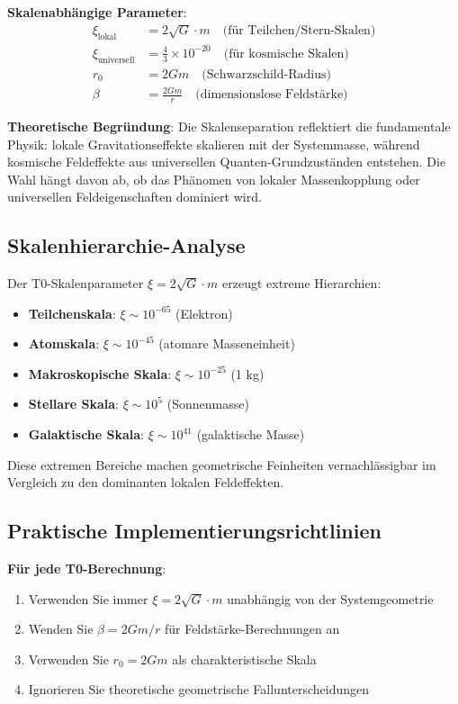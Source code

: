 \documentclass[12pt,a4paper]{article}
\begin{document}
	\textbf{Skalenabhängige Parameter}:
	\begin{align}
		\xi_{\text{lokal}} &= 2\sqrt{G} \cdot m \quad \text{(für Teilchen/Stern-Skalen)} \\
		\xi_{\text{universell}} &= \frac{4}{3} \times 10^{-20} \quad \text{(für kosmische Skalen)} \\
		r_0 &= 2Gm \quad \text{(Schwarzschild-Radius)} \\
		\beta &= \frac{2Gm}{r} \quad \text{(dimensionslose Feldstärke)}
	\end{align}
	
	\textbf{Theoretische Begründung}: Die Skalenseparation reflektiert die fundamentale Physik: lokale Gravitationseffekte skalieren mit der Systemmasse, während kosmische Feldeffekte aus universellen Quanten-Grundzuständen entstehen. Die Wahl hängt davon ab, ob das Phänomen von lokaler Massenkopplung oder universellen Feldeigenschaften dominiert wird.
	
	\subsection{Skalenhierarchie-Analyse}
	\label{subsec:scale_hierarchy}
	
	Der T0-Skalenparameter $\xi = 2\sqrt{G} \cdot m$ erzeugt extreme Hierarchien:
	
	\begin{itemize}
		\item \textbf{Teilchenskala}: $\xi \sim 10^{-65}$ (Elektron)
		\item \textbf{Atomskala}: $\xi \sim 10^{-45}$ (atomare Masseneinheit)
		\item \textbf{Makroskopische Skala}: $\xi \sim 10^{-25}$ (1 kg)
		\item \textbf{Stellare Skala}: $\xi \sim 10^{5}$ (Sonnenmasse)
		\item \textbf{Galaktische Skala}: $\xi \sim 10^{41}$ (galaktische Masse)
	\end{itemize}
	
	Diese extremen Bereiche machen geometrische Feinheiten vernachlässigbar im Vergleich zu den dominanten lokalen Feldeffekten.
	
	\subsection{Praktische Implementierungsrichtlinien}
	\label{subsec:implementation_guidelines}
	
	\textbf{Für jede T0-Berechnung}:
	\begin{enumerate}
		\item Verwenden Sie immer $\xi = 2\sqrt{G} \cdot m$ unabhängig von der Systemgeometrie
		\item Wenden Sie $\beta = 2Gm/r$ für Feldstärke-Berechnungen an
		\item Verwenden Sie $r_0 = 2Gm$ als charakteristische Skala
		\item Ignorieren Sie theoretische geometrische Fallunterscheidungen
	\end{enumerate}
	
\end{document}
